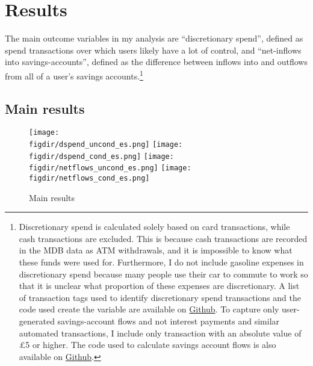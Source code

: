 \section{Results}%
\label{sec:results}

The main outcome variables in my analysis are ``discretionary spend'', defined
as spend transactions over which users likely have a lot of control, and
``net-inflows into savings-accounts'', defined as the difference between
inflows into and outflows from all of a user's savings
accounts.\footnote{Discretionary spend is calculated solely based on card
    transactions, while cash transactions are excluded. This is because cash
    transactions are recorded in the MDB data as ATM withdrawals, and it is
    impossible to know what these funds were used for. Furthermore, I do
    not include gasoline expenses in discretionary spend because many people
    use their car to commute to work so that it is unclear what proportion of
    these expenses are discretionary. A list of transaction tags used to
    identify discretionary spend transactions and the code used create the
    variable are available on
    \href{https://github.com/fabiangunzinger/mdb_eval/blob/f31bfcd7a330188cdd27968d41957ebf5b454099/src/data/aggregators.py\#L389}{Github}.
    To capture only user-generated savings-account flows and not interest
    payments and similar automated transactions, I include only transaction
with an absolute value of \pounds5 or higher. The code used to calculate
savings account flows is also available on
\href{https://github.com/fabiangunzinger/mdb_eval/blobf31bfcd7a330188cdd27968d41957ebf5b454099/src/data/aggregators.py\#L89}{Github}.}


\subsection{Main results}%
\label{sub:main_results}

\begin{figure}[h]
    \centering 
    \caption{Main results}
    \label{fig:main_results}
    \texttt{[image: \\figdir/dspend\_uncond\_es.png]}
    \texttt{[image: \\figdir/dspend\_cond\_es.png]}
    \texttt{[image: \\figdir/netflows\_uncond\_es.png]}
    \texttt{[image: \\figdir/netflows\_cond\_es.png]}
\end{figure}

